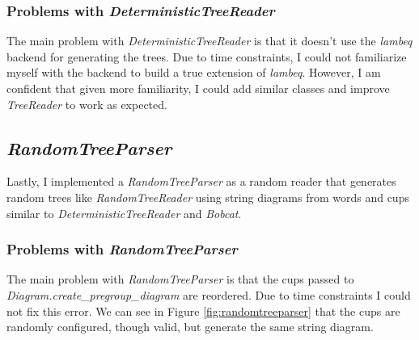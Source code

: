 \documentclass[12pt ]{article}
\begin{document}
\subsubsection{Problems with {\it DeterministicTreeReader}}
The main problem with {\it DeterministicTreeReader} is that it doesn't use the {\it lambeq} backend for generating the trees. Due to time constraints, I could not familiarize myself with the backend to build a true extension of {\it lambeq}. However, I am confident that given more familiarity, I could add similar classes and improve {\it TreeReader} to work as expected. 

\subsection{{\it RandomTreeParser}}
Lastly, I implemented a {\it RandomTreeParser} as a random reader that generates random trees like  {\it RandomTreeReader} using string diagrams from words and cups similar to {\it DeterministicTreeReader} and {\it Bobcat}.  
\subsubsection{Problems with {\it RandomTreeParser}}
The main problem with {\it RandomTreeParser} is that the cups passed to {\it Diagram.create\_pregroup\_diagram} are reordered. Due to time constraints I could not fix this error. We can see in Figure \ref{fig:randomtreeparser} that the cups are randomly configured, though valid, but generate the same string diagram. 
\end{document}
